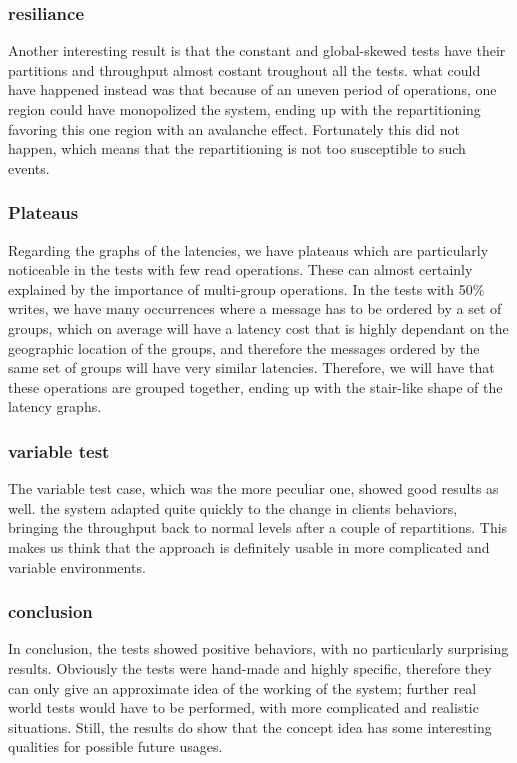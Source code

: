 \subsubsection{resiliance}
Another interesting result is that the constant and global-skewed tests have their partitions and throughput almost costant troughout all the tests. what could have happened instead was that because of an uneven period of operations, one region could have monopolized the system, ending up with the repartitioning favoring this one region with an avalanche effect. Fortunately this did not happen, which means that the repartitioning is not too susceptible to such events.

\subsubsection{Plateaus}
Regarding the graphs of the latencies, we have plateaus which are particularly noticeable in the tests with few read operations. These can almost certainly explained by the importance of multi-group operations. In the tests with 50\% writes, we have many occurrences where a message has to be ordered by a set of groups, which on average will have a latency cost that is highly dependant on the geographic location of the groups, and therefore the messages ordered by the same set of groups will have very similar latencies. Therefore, we will have that these operations are grouped together, ending up with the stair-like shape of the latency graphs. 

\subsubsection{variable test}
The variable test case, which was the more peculiar one, showed good results as well. the system adapted quite quickly to the change in clients behaviors, bringing the throughput back to normal levels after a couple of repartitions. This makes us think that the approach is definitely usable in more complicated and variable environments.

\subsubsection{conclusion}
In conclusion, the tests showed positive behaviors, with no particularly surprising results. Obviously the tests were hand-made and highly specific, therefore they can only give an approximate idea of the working of the system; further real world tests would have to be performed, with more complicated and realistic situations. Still, the results do show that the concept idea has some interesting qualities for possible future usages.

